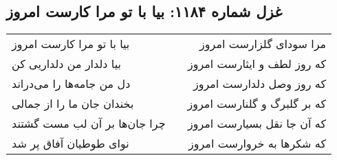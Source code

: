 \begin{center}
\section*{غزل شماره ۱۱۸۴: بیا با تو مرا کارست امروز}
\label{sec:1184}
\begin{longtable}{l p{0.5cm} r}
بیا با تو مرا کارست امروز
&&
مرا سودای گلزارست امروز
\\
بیا دلدار من دلداریی کن
&&
که روز لطف و ایثارست امروز
\\
دل من جامه‌ها را می‌دراند
&&
که روز وصل دلدارست امروز
\\
بخندان جان ما را از جمالی
&&
که بر گلبرگ و گلنارست امروز
\\
چرا جان‌ها بر آن لب مست گشتند
&&
که آن جا نقل بسیارست امروز
\\
نوای طوطیان آفاق پر شد
&&
که شکرها به خروارست امروز
\\
\end{longtable}
\end{center}
